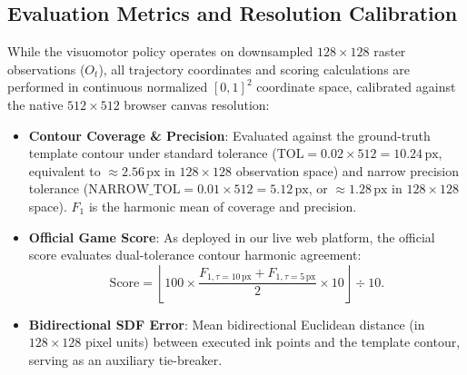 \documentclass[10pt,twocolumn,letterpaper]{article}
\begin{document}
\subsection{Evaluation Metrics and Resolution Calibration}
While the visuomotor policy operates on downsampled $128 \times 128$ raster observations ($O_t$), all trajectory coordinates and scoring calculations are performed in continuous normalized $[0, 1]^2$ coordinate space, calibrated against the native $512 \times 512$ browser canvas resolution:
\begin{itemize}
  \item \textbf{Contour Coverage \& Precision}: Evaluated against the ground-truth template contour under standard tolerance ($\text{TOL}=0.02 \times 512 = 10.24\,\text{px}$, equivalent to $\approx 2.56\,\text{px}$ in $128\times 128$ observation space) and narrow precision tolerance ($\text{NARROW\_TOL}=0.01 \times 512 = 5.12\,\text{px}$, or $\approx 1.28\,\text{px}$ in $128\times 128$ space). $F_1$ is the harmonic mean of coverage and precision.
  \item \textbf{Official Game Score}: As deployed in our live web platform, the official score evaluates dual-tolerance contour harmonic agreement:
  \begin{equation}
    \text{Score} = \left\lfloor 100 \times \frac{F_{1, \tau=10\,\text{px}} + F_{1, \tau=5\,\text{px}}}{2} \times 10 \right\rfloor \div 10.
  \end{equation}
  \item \textbf{Bidirectional SDF Error}: Mean bidirectional Euclidean distance (in $128\times 128$ pixel units) between executed ink points and the template contour, serving as an auxiliary tie-breaker.
\end{itemize}

\begin{table}[t]
  \centering
  \caption{Closed-loop rollout comparison on the 3-stroke \emph{Apple} template between the single-step MLP baseline and Drawing-VLA (ACT).}
  \label{tab:mlp_vs_act}
  \small
\end{table}
\end{document}
